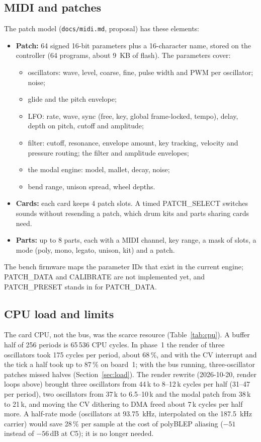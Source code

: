 \documentclass[11pt,a4paper]{article}
\newcommand{\file}[1]{\texttt{#1}}
\begin{document}
\subsection{MIDI and patches}
The patch model (\file{docs/midi.md}, proposal) has these elements:
\begin{itemize}
  \item \textbf{Patch:} 64 signed 16-bit parameters plus a 16-character name, stored on the controller (64 programs,
    about \SI{9}{KB} of flash). The parameters cover:
    \begin{itemize}
      \item oscillators: wave, level, coarse, fine, pulse width and PWM per oscillator; noise;
      \item glide and the pitch envelope;
      \item LFO: rate, wave, sync (free, key, global frame-locked, tempo), delay, depth on pitch, cutoff and amplitude;
      \item filter: cutoff, resonance, envelope amount, key tracking, velocity and pressure routing; the filter and
        amplitude envelopes;
      \item the modal engine: model, mallet, decay, noise;
      \item bend range, unison spread, wheel depths.
    \end{itemize}
  \item \textbf{Cards:} each card keeps 4 patch slots. A timed PATCH\_SELECT switches sounds without resending a patch,
    which drum kits and parts sharing cards need.
  \item \textbf{Parts:} up to 8 parts, each with a MIDI channel, key range, a mask of slots, a mode (poly, mono,
    legato, unison, kit) and a patch.
\end{itemize}
The bench firmware maps the parameter IDs that exist in the current engine; PATCH\_DATA and CALIBRATE are not
implemented yet, and PATCH\_PRESET stands in for PATCH\_DATA.

\subsection{CPU load and limits}\label{sec:cpu}
The card CPU, not the bus, was the scarce resource (Table~\ref{tab:cpu}). A buffer half of 256 periods is 65\,536
CPU cycles. In phase~1 the render of three oscillators took 175 cycles per period, about 68\,\%, and with the CV
interrupt and the tick a half took up to 87\,\% on board~1; with the bus running, three-oscillator patches missed
halves (Section~\ref{sec:load}). The render rewrite (2026-10-20, render loops above) brought three oscillators from
44\,k to 8--12\,k cycles per half (31--47 per period), two oscillators from 37\,k to 6.5--10\,k and the modal patch
from 38\,k to 21\,k, and moving the CV dithering to DMA freed about 7\,k cycles per half more. A half-rate mode
(oscillators at \SI{93.75}{kHz}, interpolated on the \SI{187.5}{kHz} carrier) would save 28\,\% per sample at the cost
of polyBLEP aliasing ($-51$ instead of $-56$\,dB at C5); it is no longer needed.
\end{document}
